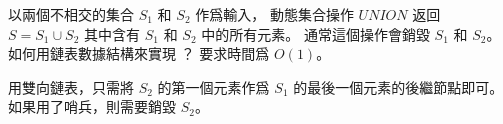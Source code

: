 \startEXERCISE
以兩個不相交的集合 $S_1$ 和 $S_2$ 作爲輸入，
動態集合操作 $UNION$ 返回 $S=S_1\cup S_2$
其中含有 $S_1$ 和 $S_2$ 中的所有元素。
通常這個操作會銷毀 $S_1$ 和 $S_2$。
如何用鏈表數據結構來實現 ？
要求時間爲 $O(1)$。
\stopEXERCISE

\startANSWER
用雙向鏈表，只需將 $S_2$ 的第一個元素作爲 $S_1$ 的最後一個元素的後繼節點即可。
如果用了哨兵，則需要銷毀 $S_2$。
\stopANSWER
